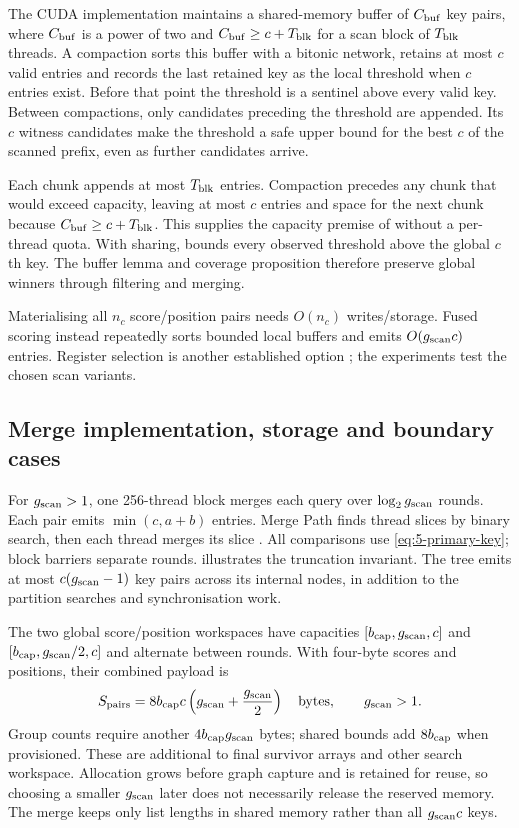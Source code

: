 The CUDA implementation maintains a shared-memory buffer of $C_{\rm buf}$ key
pairs, where $C_{\rm buf}$ is a power of two and $C_{\rm buf}\geq c+T_{\rm blk}$ for a scan block of
$T_{\rm blk}$ threads. A compaction sorts this buffer with a bitonic network,
retains at most $c$ valid entries and records the last retained key as
the local threshold when $c$ entries exist. Before that point the
threshold is a sentinel above every valid key. Between compactions,
only candidates preceding the threshold are appended. Its $c$ witness
candidates make the threshold a safe upper bound for the best $c$ of
the scanned prefix, even as further candidates arrive.

Each chunk appends at most $T_{\rm blk}$ entries. Compaction precedes
any chunk that would exceed capacity, leaving at most $c$ entries and
space for the next chunk because $C_{\rm buf}\geq c+T_{\rm blk}$.
This supplies the capacity premise of  without a
per-thread quota. With sharing,  bounds every
observed threshold above the global $c$th key. The buffer lemma and
coverage proposition therefore preserve global winners through filtering
and merging.

Materialising all $n_c$ score/position pairs needs $O(n_c)$ writes/storage. Fused scoring instead repeatedly sorts bounded local buffers and emits $O(g_{\mathrm{scan}} c)$ entries. Register selection is another established option \cite{johnson_gpu}; the experiments test the chosen scan variants.

\subsection{Merge implementation, storage and boundary cases}

For $g_{\mathrm{scan}}>1$, one 256-thread block merges each query over $\log_2g_{\mathrm{scan}}$ rounds. Each pair emits $\min(c,a+b)$ entries. Merge Path finds thread slices by binary search, then each thread merges its slice \cite{gpu_merge_path}.
All comparisons use \cref{eq:5-primary-key}; block barriers separate
rounds.  illustrates the truncation invariant.
The tree emits at most $c(g_{\mathrm{scan}}-1)$ key pairs across its internal nodes,
in addition to the partition searches and synchronisation work.

The two global score/position workspaces have capacities
$[b_{\rm cap},g_{\mathrm{scan}},c]$ and $[b_{\rm cap},g_{\mathrm{scan}}/2,c]$ and alternate between
rounds. With four-byte scores and positions, their combined payload is
\begin{equation}
 S_{\rm pairs}=8b_{\rm cap}c\left(g_{\mathrm{scan}}+\frac{g_{\mathrm{scan}}}{2}\right)
 \quad\text{bytes},\qquad g_{\mathrm{scan}}>1.
 \label{eq:5-group-workspace}
\end{equation}
Group counts require another $4b_{\rm cap}g_{\mathrm{scan}}$ bytes; shared bounds add
$8b_{\rm cap}$ when provisioned. These are additional to final survivor
arrays and other search workspace. Allocation grows before graph capture
and is retained for reuse, so choosing a smaller $g_{\mathrm{scan}}$ later does not
necessarily release the reserved memory. The merge keeps only list
lengths in shared memory rather than all $g_{\mathrm{scan}} c$ keys.

